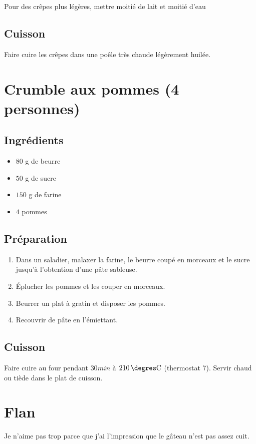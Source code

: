 \begin{remarque}
Pour des crêpes plus légères, mettre moitié de lait et moitié d'eau
\end{remarque}

\subsection*{Cuisson}
Faire cuire les crêpes dans une poêle très chaude légèrement huilée.

\newpage
\section{Crumble aux pommes (4 personnes)}
\subsection*{Ingrédients}
\begin{itemize}
\item $80$ g de beurre
\item $50$ g de sucre
\item $150$ g de farine
\item $4$ pommes
\end{itemize}

\subsection*{Préparation}
\begin{enumerate}
\item Dans un saladier, malaxer la farine, le beurre coupé en morceaux et le sucre jusqu'à l'obtention d'une pâte sableuse.
\item Éplucher les pommes et les couper en morceaux.
\item Beurrer un plat à gratin et disposer les pommes.
\item Recouvrir de pâte en l'émiettant.
\end{enumerate}

\subsection*{Cuisson}
Faire cuire au four pendant $30\unit{min}$ à $210\unit{\degres C}$ (thermostat 7). Servir chaud ou tiède dans le plat de cuisson.


\newpage
\section{Flan}
 Je n'aime pas trop parce que j'ai l'impression que le gâteau n'est pas assez cuit.
